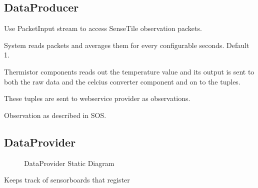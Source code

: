 \documentclass[]{final_report}
\begin{document}
\subsection{DataProducer}
Use PacketInput stream to access SenseTile observation packets.

System reads packets and averages them for every configurable seconds. Default 1.

Thermistor components reads out the temperature value
and its output is sent to both the raw data and the celcius
converter component and on to the tuples.

These tuples are sent to webservice provider as observations.

Observation as described in SOS.

\subsection {DataProvider}
 \begin{figure}
\caption{DataProvider Static Diagram}\label{fig:bon_static_diagam_provider.png}
\end{figure}
Keeps track of sensorboards that register
\end{document}

